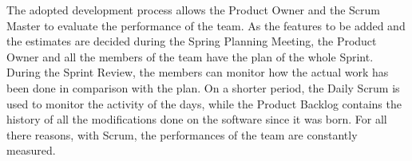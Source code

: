 		The adopted development process allows the Product Owner and the Scrum Master to evaluate the performance of the team. As the features to be added and the estimates are decided during the Spring Planning Meeting, the Product Owner and all the members of the team have the plan of the whole Sprint. During the Sprint Review, the members can monitor how the actual work has been done in comparison with the plan. On a shorter period, the Daily Scrum is used to monitor the activity of the days, while the Product Backlog contains the history of all the modifications done on the software since it was born. For all there reasons, with Scrum, the performances of the team are constantly measured.
		
			

